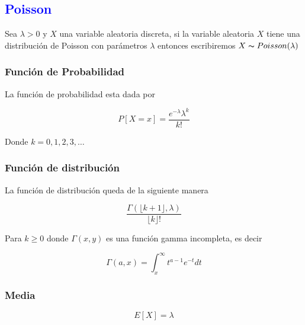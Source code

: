 \documentclass{article}
\begin{document}
\begin{multicols}{2}
        \subsection{\textcolor{blue}{Poisson}}

            Sea $\lambda > 0$ y $X$ una variable aleatoria discreta, si la variable aleatoria $X$ tiene una distribución de Poisson con parámetros $\lambda$ entonces escribiremos $X\thicksim Poisson (\lambda)$ 

                \subsubsection{Función de Probabilidad}

                    La función de probabilidad esta dada por

                        \begin{equation*}
                            P[X=x]=\frac{e^{-\lambda}\lambda ^k}{k!}
                        \end{equation*}

                    Donde $k=0,1,2,3,\ldots$

                \subsubsection{Función de distribución }

                    La función de distribución queda de la siguiente manera

                        \begin{equation*}
                            \frac{\Gamma (\lfloor k+1 \rfloor ,\lambda )}{ \lfloor k \rfloor!}
                        \end{equation*}

                    Para $k \geq 0$ donde $\Gamma (x,y)$ es una función gamma incompleta, es decir

                        \begin{equation*}
                            \Gamma (a,x) = \int _x^{\infty} t^{a-1}e^{-t} dt
                        \end{equation*}

                \subsubsection{Media}

                            \begin{equation*}
                                E[X] = \lambda
                            \end{equation*}
                

\end{multicols}
\end{document}

